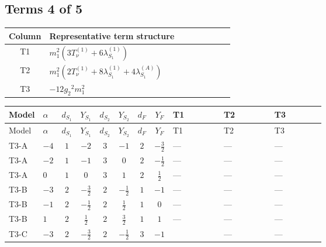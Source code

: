 \documentclass[8pt]{article}
\begin{document}
\begin{landscape}
\subsection*{Terms 4 of 5}
\begin{center}
\begin{tabular}{@{}c >{\raggedright\arraybackslash}p{0.82\linewidth}@{}}
\toprule
Column & Representative term structure \\
\midrule
T1 & \(\displaystyle {m_1^2} (3 T_{\nu}^{(1)}+6 {\lambda_{S_1}^{(1)}})\) \\
\midrule
T2 & \(\displaystyle {m_1^2} (2 T_{\nu}^{(1)}+8 {\lambda_{S_1}^{(1)}}+4 {\lambda_{S_1}^{(A)}})\) \\
\midrule
T3 & \(\displaystyle -12 {g_2}^2 {m_1^2}\) \\
\midrule
\bottomrule
\end{tabular}
\end{center}
\smallskip
\tiny
\begin{longtable}{@{}llcccccc >{\raggedright\arraybackslash}p{0.21\linewidth} >{\raggedright\arraybackslash}p{0.21\linewidth} >{\raggedright\arraybackslash}p{0.21\linewidth}@{}}
\toprule
Model & $\alpha$ & $d_{S_1}$ & $Y_{S_1}$ & $d_{S_2}$ & $Y_{S_2}$ & $d_F$ & $Y_F$ & T1 & T2 & T3 \\
\midrule
\endfirsthead
\toprule
Model & $\alpha$ & $d_{S_1}$ & $Y_{S_1}$ & $d_{S_2}$ & $Y_{S_2}$ & $d_F$ & $Y_F$ & T1 & T2 & T3 \\
\midrule
\endhead
T3-A & $-4$ & $1$ & $-2$ & $3$ & $-1$ & $2$ & $-\frac{3}{2}$ & --- & --- & --- \\
\midrule
T3-A & $-2$ & $1$ & $-1$ & $3$ & $0$ & $2$ & $-\frac{1}{2}$ & --- & --- & --- \\
\midrule
T3-A & $0$ & $1$ & $0$ & $3$ & $1$ & $2$ & $\frac{1}{2}$ & --- & --- & --- \\
\midrule
T3-B & $-3$ & $2$ & $-\frac{3}{2}$ & $2$ & $-\frac{1}{2}$ & $1$ & $-1$ & --- & --- & --- \\
\midrule
T3-B & $-1$ & $2$ & $-\frac{1}{2}$ & $2$ & $\frac{1}{2}$ & $1$ & $0$ & --- & --- & --- \\
\midrule
T3-B & $1$ & $2$ & $\frac{1}{2}$ & $2$ & $\frac{3}{2}$ & $1$ & $1$ & --- & --- & --- \\
\midrule
T3-C & $-3$ & $2$ & $-\frac{3}{2}$ & $2$ & $-\frac{1}{2}$ & $3$ & $-1$ & \scriptsize\adjustbox{max width=\linewidth}{$\begin{gathered} {m_1^2} (3 T_{\nu}^{(1)}+6 {\lambda_{S_1}^{(1)}})\end{gathered}$} & --- & --- \\

\end{longtable}
\end{landscape}
\end{document}
